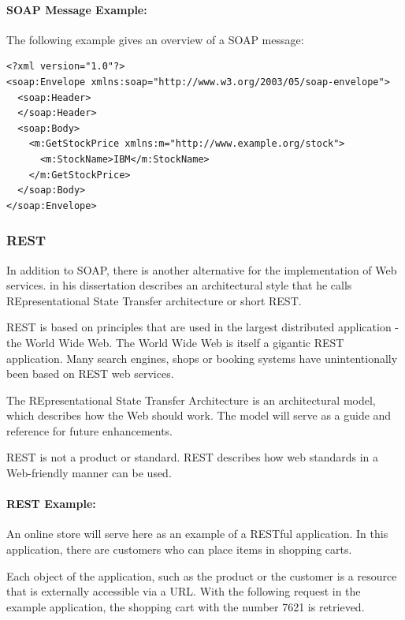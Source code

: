 \paragraph{SOAP Message Example:}

The following example gives an overview of a SOAP message:

\lstset{language=XML}
\begin{lstlisting}
<?xml version="1.0"?>
<soap:Envelope xmlns:soap="http://www.w3.org/2003/05/soap-envelope">
  <soap:Header>
  </soap:Header>
  <soap:Body>
    <m:GetStockPrice xmlns:m="http://www.example.org/stock">
      <m:StockName>IBM</m:StockName>
    </m:GetStockPrice>
  </soap:Body>
</soap:Envelope>
\end{lstlisting}

\subsubsection{REST\label{sec:back_tech_ws_rest}}
In addition to SOAP, there is another alternative for the implementation of Web services. \citeauthor{Fielding2000} in his dissertation describes an architectural style that he calls REpresentational State Transfer architecture or short REST.

REST is based on principles that are used in the largest distributed application - the World Wide Web. The World Wide Web is itself a gigantic REST application. Many search engines, shops or booking systems have unintentionally been based on REST web services.

The REpresentational State Transfer Architecture is an architectural model, which describes how the Web should work. The model will serve as a guide and reference for future enhancements.

REST is not a product or standard. REST describes how web standards in a Web-friendly manner can be used.


\paragraph{REST Example:} An online store will serve here as an example of a RESTful application. In this application, there are customers who can place items in shopping carts.

Each object of the application, such as the product or the customer is a resource that is externally accessible via a URL. With the following request in the example application, the shopping cart with the number 7621 is retrieved.

